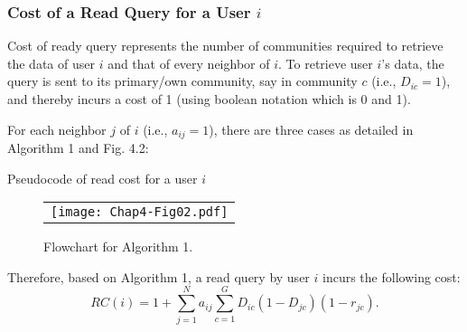 \subsubsection{Cost of a Read Query for a User $i$}\label{Chap4_03_03_01}
Cost of ready query represents the number of communities required to retrieve the data of user $i$ and that of every neighbor of $i$. To retrieve user $i$'s data, the query is sent to its primary/own community, say in community $c$ (i.e., $D_{ic} = 1$), and thereby incurs a cost of 1 (using boolean notation which is 0 and 1).

For each neighbor $j$ of $i$ (i.e., $a_{ij} = 1$), there are three cases as detailed in Algorithm 1 and Fig. 4.2:

\begin{algorithm}
\caption{Pseudocode of read cost for a user $i$}
\label{alg:chap4_alg01}
\end{algorithm}

\begin{figure}[h]\label{fig:Chap4-Fig02}
\begin{center}
  \begin{tabular}{c}
  \texttt{[image: Chap4-Fig02.pdf]}
  \end{tabular}
  \caption{Flowchart for Algorithm 1.}
\end{center}
\end{figure}

Therefore, based on Algorithm 1, a read query by user $i$ incurs the following cost:
\begin{equation}
RC(i)=1+\sum_{j=1}^N a_{ij}\sum_{c=1}^G D_{ic}(1-D_{jc})(1-r_{jc}).
\end{equation}



